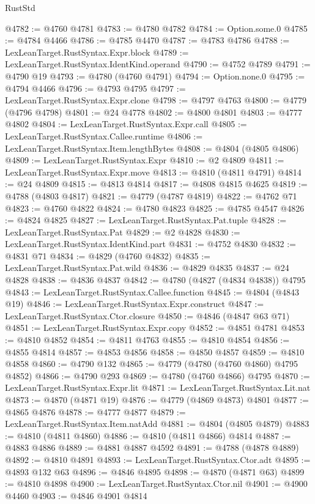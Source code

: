 \begin{lexlean}{RustStd}
\begin{coremodule}
@4782 := @4760 @4781
@4783 := @4780 @4782
@4784 := Option.some.{0}
@4785 := @4784 @4466
@4786 := @4785 @4470
@4787 := @4783 @4786
@4788 := LexLeanTarget.RustSyntax.Expr.block
@4789 := LexLeanTarget.RustSyntax.IdentKind.operand
@4790 := @4752 @4789
@4791 := @4790 @19
@4793 := @4780 (@4760 @4791)
@4794 := Option.none.{0}
@4795 := @4794 @4466
@4796 := @4793 @4795
@4797 := LexLeanTarget.RustSyntax.Expr.clone
@4798 := @4797 @4763
@4800 := @4779 (@4796 @4798)
@4801 := @24 @4778
@4802 := @4800 @4801
@4803 := @4777 @4802
@4804 := LexLeanTarget.RustSyntax.Expr.call
@4805 := LexLeanTarget.RustSyntax.Callee.runtime
@4806 := LexLeanTarget.RustSyntax.Item.lengthBytes
@4808 := @4804 (@4805 @4806)
@4809 := LexLeanTarget.RustSyntax.Expr
@4810 := @2 @4809
@4811 := LexLeanTarget.RustSyntax.Expr.move
@4813 := @4810 (@4811 @4791)
@4814 := @24 @4809
@4815 := @4813 @4814
@4817 := @4808 @4815 @4625
@4819 := @4788 (@4803 @4817)
@4821 := @4779 (@4787 @4819)
@4822 := @4762 @71
@4823 := @4760 @4822
@4824 := @4780 @4823
@4825 := @4785 @4547
@4826 := @4824 @4825
@4827 := LexLeanTarget.RustSyntax.Pat.tuple
@4828 := LexLeanTarget.RustSyntax.Pat
@4829 := @2 @4828
@4830 := LexLeanTarget.RustSyntax.IdentKind.part
@4831 := @4752 @4830
@4832 := @4831 @71
@4834 := @4829 (@4760 @4832)
@4835 := LexLeanTarget.RustSyntax.Pat.wild
@4836 := @4829 @4835
@4837 := @24 @4828
@4838 := @4836 @4837
@4842 := @4780 (@4827 (@4834 @4838)) @4795
@4843 := LexLeanTarget.RustSyntax.Callee.function
@4845 := @4804 (@4843 @19)
@4846 := LexLeanTarget.RustSyntax.Expr.construct
@4847 := LexLeanTarget.RustSyntax.Ctor.closure
@4850 := @4846 (@4847 @63 @71)
@4851 := LexLeanTarget.RustSyntax.Expr.copy
@4852 := @4851 @4781
@4853 := @4810 @4852
@4854 := @4811 @4763
@4855 := @4810 @4854
@4856 := @4855 @4814
@4857 := @4853 @4856
@4858 := @4850 @4857
@4859 := @4810 @4858
@4860 := @4790 @132
@4865 := @4779 (@4780 (@4760 @4860) @4795 @4852)
@4866 := @4790 @293
@4869 := @4780 (@4760 @4866) @4795
@4870 := LexLeanTarget.RustSyntax.Expr.lit
@4871 := LexLeanTarget.RustSyntax.Lit.nat
@4873 := @4870 (@4871 @19)
@4876 := @4779 (@4869 @4873) @4801
@4877 := @4865 @4876
@4878 := @4777 @4877
@4879 := LexLeanTarget.RustSyntax.Item.natAdd
@4881 := @4804 (@4805 @4879)
@4883 := @4810 (@4811 @4860)
@4886 := @4810 (@4811 @4866) @4814
@4887 := @4883 @4886
@4889 := @4881 @4887 @4592
@4891 := @4788 (@4878 @4889)
@4892 := @4810 @4891
@4893 := LexLeanTarget.RustSyntax.Ctor.adt
@4895 := @4893 @132 @63
@4896 := @4846 @4895
@4898 := @4870 (@4871 @63)
@4899 := @4810 @4898
@4900 := LexLeanTarget.RustSyntax.Ctor.nil
@4901 := @4900 @4460
@4903 := @4846 @4901 @4814

\end{coremodule}
\end{lexlean}
